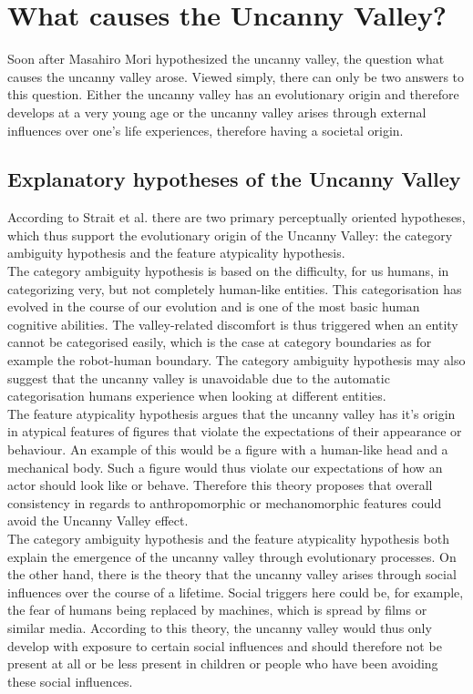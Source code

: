 \chapter{What causes the Uncanny Valley?}
Soon after Masahiro Mori hypothesized the uncanny valley, the question what causes the uncanny valley arose. Viewed simply, there can only be two answers to this question. Either the uncanny valley has an evolutionary origin and therefore develops at a very young age or the uncanny valley arises through external influences over one's life experiences, therefore having a societal origin. 
\section{Explanatory hypotheses of the Uncanny Valley}
According to Strait et al. \cite{childrens_responding} there are two primary perceptually oriented hypotheses, which thus support the evolutionary origin of the Uncanny Valley: the category ambiguity hypothesis and the feature atypicality hypothesis.\\
The category ambiguity hypothesis \cite{childrens_responding} is based on the difficulty, for us humans, in categorizing very, but not completely human-like entities. This categorisation has evolved in the course of our evolution and is one of the
most basic human cognitive abilities. The valley-related discomfort is thus triggered when an entity cannot be categorised easily, which is the case at category boundaries as for example the robot-human boundary. The category ambiguity hypothesis may also suggest that the uncanny valley is unavoidable due to the automatic categorisation humans experience when looking at different entities.\\
The feature atypicality hypothesis \cite{childrens_responding} argues that the uncanny valley has it's origin in atypical features of figures that violate the expectations of their appearance or behaviour. An example of this would be a figure with a human-like head and a mechanical body. Such a figure would thus violate our expectations of how an actor should look like or behave. Therefore this theory proposes that overall consistency in regards to anthropomorphic or mechanomorphic features could avoid the Uncanny Valley effect.\\
The category ambiguity hypothesis and the feature atypicality hypothesis both explain the emergence of the uncanny valley through evolutionary processes. On the other hand, there is the theory that the uncanny valley arises through social influences over the course of a lifetime. Social triggers here could be, for example, the fear of humans being replaced by machines, which is spread by films or similar media. According to this theory, the uncanny valley would thus only develop with exposure to certain social influences and should therefore not be present at all or be less present in children or people who have been avoiding these social influences. 

